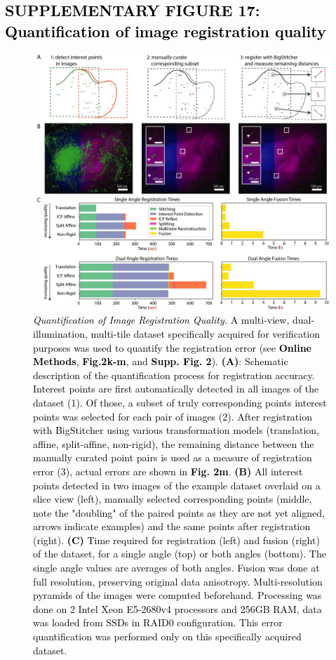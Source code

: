 \documentclass[]{spie}  %
\def\red{\textcolor{black}}
\begin{document}
\subsection*{\red{SUPPLEMENTARY FIGURE 17: Quantification of image registration quality}}
\vspace{-2mm}
\begin{figure}[h!]
\includegraphics[width=\textwidth]{bigstitcher_registrationquality.jpg}
\vspace{-4.0mm}
\caption{\hspace{-0.5mm} \red{\emph{Quantification of Image Registration Quality.} A multi-view, dual-illumination, multi-tile dataset specifically acquired for verification purposes was used to quantify the registration error (see \textbf{Online Methods}, \textbf{Fig.2k-m}, and \textbf{Supp. Fig. 2}). \textbf{(A)}: Schematic description of the quantification process for registration accuracy. Interest points are first automatically detected in all images of the dataset (1). Of those, a subset of truly corresponding points interest points was selected for each pair of images (2). After registration with BigStitcher using various transformation models (translation, affine, split-affine, non-rigid), the remaining distance between the manually curated point pairs is used as a measure of registration error (3), actual errors are shown in \textbf{Fig. 2m}. \textbf{(B)} All interest points detected in two images of the example dataset overlaid on a slice view (left), manually selected corresponding points (middle, note the "doubling" of the paired points as they are not yet aligned, arrows indicate examples) and the same points after registration (right). \textbf{(C)} Time required for registration (left) and fusion (right) of the dataset, for a single angle (top) or both angles (bottom). The single angle values are averages of both angles. Fusion was done at full resolution, preserving original data anisotropy. Multi-resolution pyramids of the images were computed beforehand. Processing was done on 2 Intel Xeon E5-2680v4 processors and 256GB RAM, data was loaded from SSDs in RAID0 configuration. This error quantification was performed only on this specifically acquired dataset.
}}
\end{figure}
\end{document}
